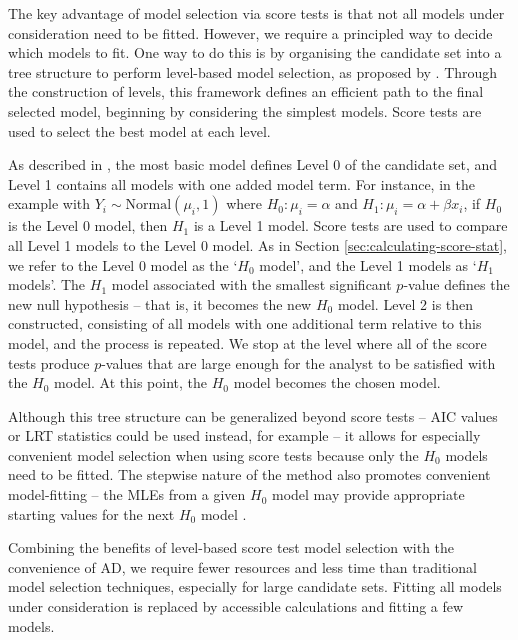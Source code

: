 \documentclass{article}
\begin{document}
The key advantage of model selection via score tests is that not all 
models under consideration need to be fitted. However, we require a
principled way to decide which models to fit. One way to do this is by
organising the candidate set into a tree 
structure to perform level-based model selection, as proposed by
\textcite{catchpoleMorgan1996}. Through the construction of levels,
this framework defines an efficient path to the final selected model,
beginning by considering the simplest models. Score tests are used to
select the best model at each level. 


As described in \textcite{mccreaMorgan2011}, 
the most basic model defines Level 0 of the candidate set, and Level 1
contains all models with one added model term. For instance, in the
example with $Y_i \sim \text{Normal}(\mu_i, 1)$ where $H_0: \mu_i =
\alpha$ and $H_1: \mu_i = \alpha + \beta x_i$, if $H_0$ is the Level 0
model, then $H_1$ is a Level 1 model. Score tests are used to compare
all Level 1  models to the Level 0 model. As in 
Section \ref{sec:calculating-score-stat}, we refer to the Level 0
model as the `$H_0$ model', and the Level 1 models as `$H_1$
models'. The $H_1$ model associated with the smallest significant
$p$-value defines the new null hypothesis -- that is, it becomes the new
$H_0$ model. Level 2 is then constructed, consisting of all models with one
additional term relative to this model, and the
process is repeated. We stop at the
level where all of the score tests produce $p$-values 
that are large enough for the analyst to be satisfied with the $H_0$
model. At this point, the $H_0$ model becomes the chosen model.

Although this tree structure can be generalized beyond score tests -- AIC values
or LRT statistics could be used instead, for example
-- it allows for especially convenient model selection when using
score tests because only the $H_0$ models need to be fitted. The
stepwise nature of the method also promotes 
convenient model-fitting -- the MLEs from a given $H_0$ model may
provide appropriate starting values for the next $H_0$ model
\parencite{mccreaMorgan2011}.

Combining the benefits of level-based
score test model selection with the convenience of AD, we require
fewer resources and less time than traditional model selection
techniques, especially for large candidate sets. Fitting all models
under consideration is replaced by accessible calculations and fitting
a few models.   
\end{document}
